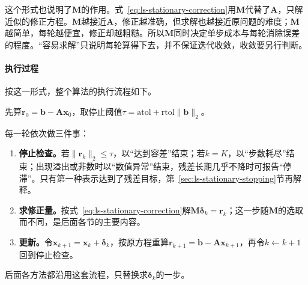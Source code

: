 这个形式也说明了$\bm M$的作用。式~\eqref{eq:ls-stationary-correction}用$\bm M$代替了$\bm A$，只解近似的修正方程。$\bm M$越接近$\bm A$，修正越准确，但求解也越接近原问题的难度；$\bm M$越简单，每轮越便宜，修正却越粗糙。所以$\bm M$同时决定单步成本与每轮消除误差的程度。“容易求解”只说明每轮算得下去，并不保证迭代收敛，收敛要另行判断。

\paragraph{执行过程} 按这一形式，整个算法的执行流程如下。

先算$\bm r_0=\bm b-\bm A\bm x_0$，取停止阈值$\tau=\mathrm{atol}+\mathrm{rtol}\lVert\bm b\rVert_2$。

每一轮依次做三件事：
\begin{enumerate}
 \item \textbf{停止检查。}若$\lVert\bm r_k\rVert_2\leq\tau$，以“达到容差”结束；若$k=K$，以“步数耗尽”结束；出现溢出或非数时以“数值异常”结束，残差长期几乎不降时可报告“停滞”。只有第一种表示达到了残差目标，第~\ref{sec:ls-stationary-stopping}节再解释。
 \item \textbf{求修正量。}按式~\eqref{eq:ls-stationary-correction}解$\bm M\bm\delta_k=\bm r_k$；这一步随$\bm M$的选取而不同，是后面各节的主要内容。
 \item \textbf{更新。}令$\bm x_{k+1}=\bm x_k+\bm\delta_k$，按原方程重算$\bm r_{k+1}=\bm b-\bm A\bm x_{k+1}$，再令$k\leftarrow k+1$回到停止检查。
\end{enumerate}

后面各方法都沿用这套流程，只替换求$\bm\delta_k$的一步。

